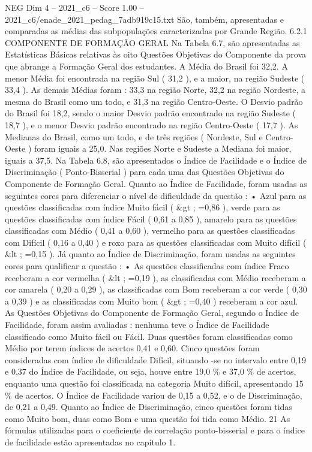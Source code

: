 \begin{textsample}{NEG Dim 4 – 2021\_c6 – Score 1.00 – 2021\_c6/enade\_2021\_pedag\_7adb919c15.txt}
São, também, apresentadas e comparadas as médias das subpopulações caracterizadas por Grande Região. 6.2.1 COMPONENTE DE FORMAÇÃO GERAL Na Tabela 6.7, são apresentadas as Estatísticas Básicas relativas às oito Questões Objetivas do Componente da prova que abrange a Formação Geral dos estudantes.
A Média do Brasil foi 32,2.
A menor Média foi encontrada na região Sul ( 31,2 ), e a maior, na região Sudeste ( 33,4 ).
As demais Médias foram : 33,3 na região Norte, 32,2 na região Nordeste, a mesma do Brasil como um todo, e 31,3 na região Centro-Oeste.
O Desvio padrão do Brasil foi 18,2, sendo o maior Desvio padrão encontrado na região Sudeste ( 18,7 ), e o menor Desvio padrão encontrado na região Centro-Oeste ( 17,7 ).
As Medianas do Brasil, como um todo, e de três regiões ( Nordeste, Sul e Centro-Oeste ) foram iguais a 25,0.
Nas regiões Norte e Sudeste a Mediana foi maior, iguais a 37,5.
Na Tabela 6.8, são apresentados o Índice de Facilidade e o Índice de Discriminação ( Ponto-Bisserial ) para cada uma das Questões Objetivas do Componente de Formação Geral.
Quanto ao Índice de Facilidade, foram usadas as seguintes cores para diferenciar o nível de dificuldade da questão : • Azul para as questões classificadas com índice Muito fácil ( \&gt ; =0,86 ), verde para as questões classificadas com índice Fácil ( 0,61 a 0,85 ), amarelo para as questões classificadas com Médio ( 0,41 a 0,60 ), vermelho para as questões classificadas com Difícil ( 0,16 a 0,40 ) e roxo para as questões classificadas com Muito difícil ( \&lt ; =0,15 ).
Já quanto ao Índice de Discriminação, foram usadas as seguintes cores para qualificar a questão : • As questões classificadas com índice Fraco receberam a cor vermelha ( \&lt ; =0,19 ), as classificadas com Médio receberam a cor amarela ( 0,20 a 0,29 ), as classificadas com Bom receberam a cor verde ( 0,30 a 0,39 ) e as classificadas com Muito bom ( \&gt ; =0,40 ) receberam a cor azul.
As Questões Objetivas do Componente de Formação Geral, segundo o Índice de Facilidade, foram assim avaliadas : nenhuma teve o Índice de Facilidade classificado como Muito fácil ou Fácil.
Duas questões foram classificadas como Médio por terem índices de acertos 0,41 e 0,60.
Cinco questões foram consideradas com índice de dificuldade Difícil, situando -se no intervalo entre 0,19 e 0,37 do Índice de Facilidade, ou seja, houve entre 19,0 \% e 37,0 \% de acertos, enquanto uma questão foi classificada na categoria Muito difícil, apresentando 15 \% de acertos.
O Índice de Facilidade variou de 0,15 a 0,52, e o de Discriminação, de 0,21 a 0,49.
Quanto ao Índice de Discriminação, cinco questões foram tidas como Muito bom, duas como Bom e uma questão foi tida como Médio. 21 As fórmulas utilizadas para o coeficiente de correlação ponto-bisserial e para o índice de facilidade estão apresentadas no capítulo 1.

\end{textsample}
